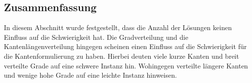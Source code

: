 \subsection{Zusammenfassung}
In diesem Abschnitt wurde festgestellt, dass die Anzahl der Lösungen keinen Einfluss auf die Schwierigkeit hat.
Die Gradverteilung und die Kantenlängenverteilung hingegen scheinen einen Einfluss auf die Schwierigkeit für die Kantenformulierung zu haben.
Hierbei deuten viele kurze Kanten und breit verteilte Grade auf eine schwere Instanz hin.
Wohingegen verteilte längere Kanten und wenige hohe Grade auf eine leichte Instanz hinweisen.



